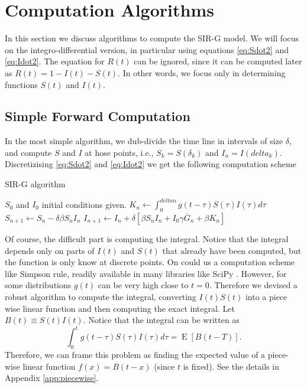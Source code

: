 \documentclass[twoside,USenglish,10pt]{article}
\newcommand{\Gb}{\overline{G}\xspace}
\DeclareMathOperator{\Exp}{E}       %
\newcommand{\E}[1]{\Exp\left[{#1}\right]}       %
\begin{document}
\section{Computation Algorithms}\label{sc:algorithm}

In this section we discuss algorithms to compute the SIR-G model. We will focus on the integro-differential version, in particular using equations \eqref{eq:Sdot2} and \eqref{eq:Idot2}. The equation for $R(t)$ can be ignored, since it can be computed later as $R(t)=1-I(t)-S(t)$. In other words, we focus only in determining functions $S(t)$ and $I(t)$.

\subsection{Simple Forward Computation}

In the most simple algorithm, we dub-divide the time line in intervals of size $\delta$, and compute $S$ and $I$ at hose points, i.e., $S_k=S(\delta_k)$ and $I_n=I(delta_k)$. Discretizising \eqref{eq:Sdot2} and \eqref{eq:Idot2} we get the following computation scheme

\begin{algorithm}
    \caption{SIR-G algorithm}
    \label{al:simple}
    \begin{algorithmic}[1] %
		\State	$S_0$ and $I_0$  initial conditions given.
			\State $K_n \gets \int_0^{delta n} g(t-\tau) S(\tau)I(\tau)d\tau$  
			\State $S_{n+1} \gets  S_n - \delta\beta S_n I_n$
			\State $I_{n+1} \gets  I_n + \delta\left[\beta S_n I_n + I_0\gamma\Gb_n + \beta K_n\right]$
		\EndFor	
    \end{algorithmic}
\end{algorithm}


Of course, the difficult part is computing the integral. Notice that the integral depends only on parts of $I(t)$ and $S(t)$ that already have been computed, but the function is only know at discrete points.
On could us a computation scheme like Simpson rule, readily available in many libraries like SciPy \cite{jon.ea.01}. However, for some distributions $g(t)$ can be very high close to $t=0$. Therefore we devised a robust algorithm to compute the integral, converting $I(t)S(t)$ into a piece wise linear function and then computing the exact integral. Let $B(t)\equiv S(t)I(t)$. Notice that the integral can be written as
\[ \int_0^{t} g(t-\tau) S(\tau)I(\tau)d\tau = \E{B(t-T)}.  \]
Therefore, we can frame this problem as finding the expected value of a piece-wise linear function $f(x)=B(t-x)$ (since $t$ is fixed). See the details in Appendix \ref{app:piecewise}.
\end{document}
